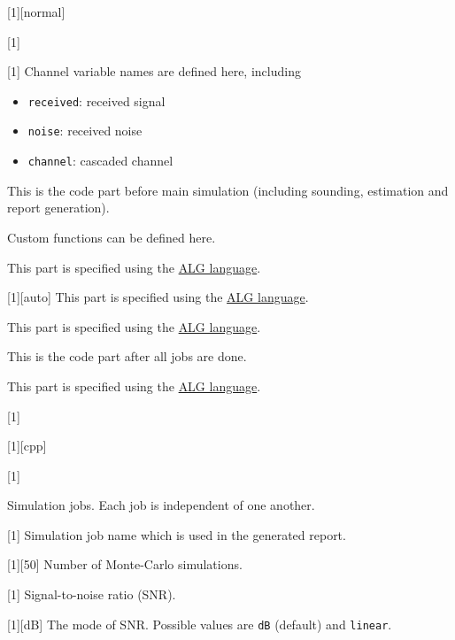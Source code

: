 [1][normal]

[1]

[1]
Channel variable names are defined here, including
\begin{itemize}
  \item \texttt{received}: received signal
  \item \texttt{noise}: received noise
  \item \texttt{channel}: cascaded channel
\end{itemize}

This is the code part before main simulation
(including sounding, estimation and report generation).
\begin{tip}
  Custom functions can be defined here.
\end{tip}
This part is specified using the \hyperref[d:chap:alg_lang]{ALG language}.

[1][auto]
This part is specified using the \hyperref[d:chap:alg_lang]{ALG language}.

This part is specified using the \hyperref[d:chap:alg_lang]{ALG language}.

This is the code part after all jobs are done.

This part is specified using the \hyperref[d:chap:alg_lang]{ALG language}.

[1]

[1][cpp]

[1]

Simulation jobs.
Each job is independent of one another.

[1]
Simulation job name which is used in the generated report.

[1][50]
Number of Monte-Carlo simulations.

[1]
Signal-to-noise ratio (SNR).

[1][dB]
The mode of SNR. Possible values are \texttt{dB} (default) and \texttt{linear}.

